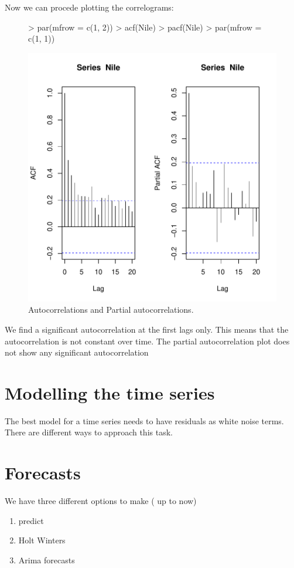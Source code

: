 \documentclass[11pt, a4paper]{article} %
\begin{document}
\noindent Now we can procede plotting the correlograms:
\begin{figure}[H]
\centering
\begin{Schunk}
\begin{Sinput}
> par(mfrow = c(1, 2))
> acf(Nile)
> pacf(Nile)
> par(mfrow = c(1, 1))
\end{Sinput}
\end{Schunk}
\includegraphics{sweaveclean-018}
\caption{Autocorrelations and Partial autocorrelations.}
\end{figure}

\noindent We find a significant autocorrelation at the first lags only. This means that the autocorrelation is not constant over time.
The  partial autocorrelation plot does not show any significant autocorrelation 

\section{Modelling the time series}
The best model for a time series needs to have residuals as white noise terms. 
There are different ways to approach this task. 


\section{Forecasts}%
We have three different options to make ( up to now)
\begin{enumerate}
  \item predict
  \item Holt Winters
  \item Arima forecasts
\end{enumerate}
\end{document}
